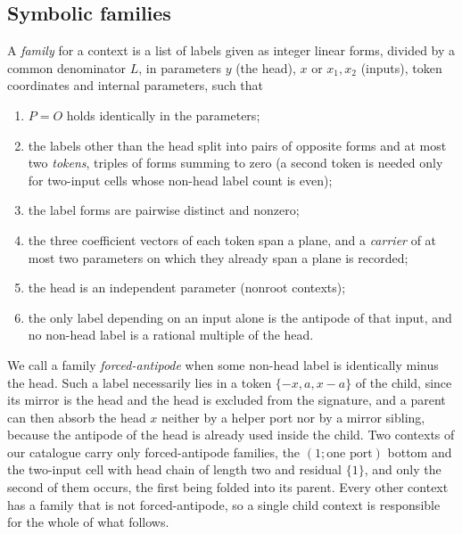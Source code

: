 \documentclass[11pt,a4paper]{article}
\theoremstyle{plain}
\theoremstyle{definition}
\theoremstyle{remark}
\newcommand{\PO}{P\!=\!O}
\begin{document}
\subsection{Symbolic families}

A \emph{family} for a context is a list of labels given as integer linear
forms, divided by a common denominator $L$, in parameters $y$ (the head),
$x$ or $x_1,x_2$ (inputs), token coordinates and internal parameters, such
that
\begin{enumerate}
\item[(E1)] $\PO$ holds identically in the parameters;
\item[(E2)] the labels other than the head split into pairs of opposite forms
  and at most two \emph{tokens}, triples of forms summing to zero (a second
  token is needed only for two-input cells whose non-head label count is
  even);
\item[(E3)] the label forms are pairwise distinct and nonzero;
\item[(E4)] the three coefficient vectors of each token span a plane, and a
  \emph{carrier} of at most two parameters on which they already span a
  plane is recorded;
\item[(E5)] the head is an independent parameter (nonroot contexts);
\item[(E6)] the only label depending on an input alone is the antipode of that
  input, and no non-head label is a rational multiple of the head.
\end{enumerate}
We call a family \emph{forced-antipode} when some non-head label is
identically minus the head.  Such a label necessarily lies in a token
$\{-x,a,x-a\}$ of the child, since its mirror is the head and the head is
excluded from the signature, and a parent can then absorb the head $x$
neither by a helper port nor by a mirror sibling, because the antipode of the
head is already used inside the child.  Two contexts of our catalogue carry
only forced-antipode families, the $(1;\text{one port})$ bottom and the
two-input cell with head chain of length two and residual $\{1\}$, and only
the second of them occurs, the first being folded into its parent.  Every
other context has a family that is not forced-antipode, so a single child
context is responsible for the whole of what follows.
\end{document}
